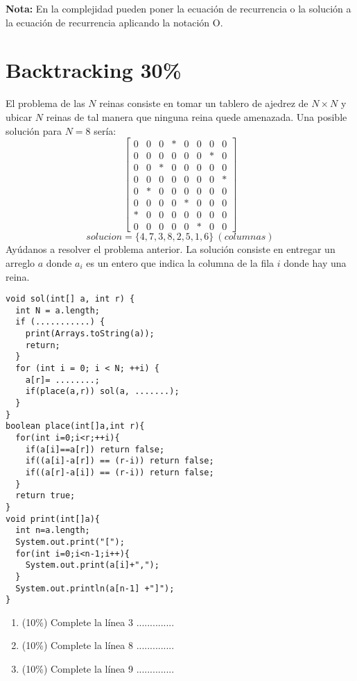 \documentclass[10 pt]{article}
\begin{document}
\begin{multicols}{2}
\textbf{Nota:} En la complejidad pueden poner la ecuación de recurrencia o la solución a la ecuación de recurrencia aplicando la notación O.

\section{Backtracking 30\%}
El problema de las $N$ reinas consiste en tomar un tablero de ajedrez de $N\times N$ y ubicar $N$ reinas de tal manera que ninguna reina quede amenazada. Una posible solución para $N=8$ sería:
\[
\begin{bmatrix}
0 & 0 & 0 & * & 0 & 0 & 0 & 0 \\
0 & 0 & 0 & 0 & 0 & 0 & * & 0 \\
0 & 0 & * & 0 & 0 & 0 & 0 & 0 \\
0 & 0 & 0 & 0 & 0 & 0 & 0 & * \\
0 & * & 0 & 0 & 0 & 0 & 0 & 0 \\
0 & 0 & 0 & 0 & * & 0 & 0 & 0 \\
* & 0 & 0 & 0 & 0 & 0 & 0 & 0 \\
0 & 0 & 0 & 0 & 0 & * & 0 & 0
\end{bmatrix}
\]
\[
solucion=\{4,7,3,8,2,5,1,6\}\ (columnas)
\]
Ayúdanos a resolver el problema anterior. La solución consiste en entregar un arreglo $a$ donde $a_i$ es un entero que indica la columna de la fila $i$ donde hay una reina.

\begin{lstlisting}
void sol(int[] a, int r) {
  int N = a.length;
  if (...........) {
    print(Arrays.toString(a));
    return;
  }
  for (int i = 0; i < N; ++i) {
    a[r]= ........;
    if(place(a,r)) sol(a, .......);
  }
}
boolean place(int[]a,int r){
  for(int i=0;i<r;++i){
    if(a[i]==a[r]) return false;
    if((a[i]-a[r]) == (r-i)) return false;
    if((a[r]-a[i]) == (r-i)) return false;
  }
  return true;
}
void print(int[]a){
  int n=a.length;
  System.out.print("[");
  for(int i=0;i<n-1;i++){
    System.out.print(a[i]+",");
  }
  System.out.println(a[n-1] +"]");
}
\end{lstlisting}
\begin{enumerate}[label=\alph*)]
	\item (10\%) Complete la línea 3 ..............
	\item (10\%) Complete la línea 8 ..............
	\item (10\%) Complete la línea 9 ..............
\end{enumerate}
\end{multicols}
\end{document}
